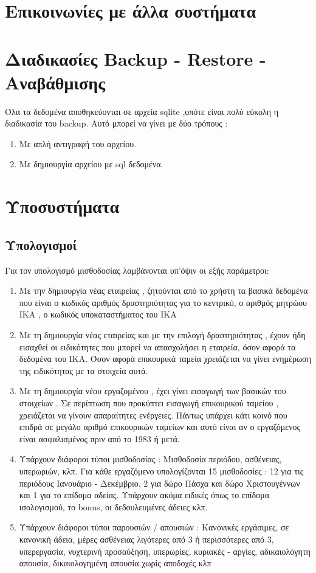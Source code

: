 \documentclass[A4,10pt,greek]{book}
\begin{document}
\section{Επικοινωνίες με άλλα συστήματα}
\section{Διαδικασίες Backup - Restore - Αναβάθμισης}
Όλα τα δεδομένα αποθηκεύονται σε αρχεία sqlite ,οπότε είναι πολύ εύκολη η διαδικασία του backup. Αυτό μπορεί να γίνει με δύο τρόπους :
\begin{enumerate}
\item Με απλή αντιγραφή του αρχείου.
\item Με δημιουργία αρχείου με sql δεδομένα.
\end{enumerate}
\section{Υποσυστήματα}
\subsection{Υπολογισμοί}
Για τον υπολογισμό μισθοδοσίας λαμβάνονται υπ'όψιν οι εξής παράμετροι:
\begin{enumerate}
\item Με την δημιουργία νέας εταιρείας , ζητούνται από το χρήστη τα βασικά δεδομένα που είναι ο κωδικός αριθμός δραστηριότητας για το κεντρικό, ο αριθμός μητρώου ΙΚΑ , ο κωδικός υποκαταστήματος του ΙΚΑ
\item Με τη δημιουργία νέας εταιρείας και με την επιλογή δραστηριότητας , έχουν ήδη εισαχθεί οι ειδικότητες που μπορεί να απασχολήσει η εταιρεία, όσον αφορά τα δεδομένα του ΙΚΑ. Όσον αφορά επικουρικά ταμεία χρειάζεται να γίνει ενημέρωση της ειδικότητας με τα στοιχεία αυτά.
\item Με τη δημιουργία νέου εργαζομένου , έχει γίνει εισαγωγή των βασικών του στοιχείων . Σε περίπτωση που προκύπτει εισαγωγή επικουρικού ταμείου , χρειάζεται να γίνουν απαραίτητες ενέργειες. Πάντως υπάρχει κάτι κοινό που επιδρά σε μεγάλο αριθμό επικουρικών ταμείων και αυτό είναι αν ο εργαζόμενος είναι ασφαλισμένος πριν από το 1983 ή μετά.
\item Υπάρχουν διάφοροι τύποι μισθοδοσίας : Μισθοδοσία περιόδου, ασθένειας, υπερωριών, κλπ. Για κάθε εργαζόμενο υπολογίζονται 15 μισθοδοσίες : 12 για τις περιόδους Ιανουάριο - Δεκέμβριο, 2 για δώρο Πάσχα και δώρο Χριστουγέννων και 1 για το επίδομα αδείας. Υπάρχουν ακόμα ειδικές όπως το επίδομα ισολογισμού, το bonus, οι δεδουλευμένες άδειες κλπ.
\item Υπάρχουν διάφοροι τύποι παρουσιών / απουσιών : Κανονικές εργάσιμες, σε κανονική άδεια, μέρες ασθένειας λιγότερες από 3 ή περισσότερες από 3, υπερεργασία, νυχτερινή προσαύξηση, υπερωρίες, κυριακές - αργίες, αδικαιολόγητη απουσία, δικαιολογημένη απουσία χωρίς αποδοχές κλπ
\end{enumerate}
\end{document}
